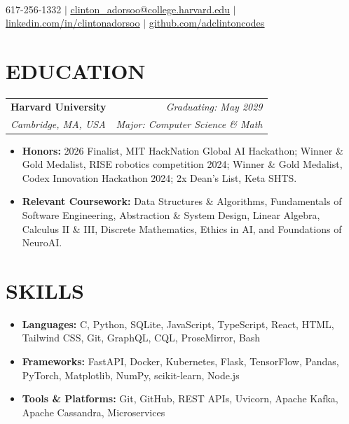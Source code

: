 \documentclass[letterpaper,8pt]{extarticle}
\makeatletter
\newcommand{\ulink}[2]{\href{#1}{\underline{#2}}}
\newcommand{\resumeSubheading}[4]{%
  \vspace{2.4pt}%
  \begin{tabular*}{\textwidth}[t]{@{\extracolsep{\fill}}l r@{}}
    \textbf{#1} & \textit{#2} \\[0.7pt]
    \textit{#3} & \textit{#4} \\
  \end{tabular*}%
  \vspace{1.4pt}%
}
\makeatother
\begin{document}
\enlargethispage{0.55in}

\begin{center}
  {\fontsize{28}{32}\selectfont
   }\\[7pt]
  {\large
  617-256-1332
  \;$|$\;
  \ulink{mailto:clinton_adorsoo@college.harvard.edu}{clinton\_adorsoo@college.harvard.edu}
  \;$|$\;
  \ulink{https://linkedin.com/in/clintonadorsoo}{linkedin.com/in/clintonadorsoo}
  \;$|$\;
  \ulink{https://github.com/adclintoncodes}{github.com/adclintoncodes}}
\end{center}

\vspace{7pt}

\section{EDUCATION}
\resumeSubheading
  {Harvard University}{Graduating: May 2029}
  {Cambridge, MA, USA}{Major: Computer Science \& Math}
\begin{itemize}
  \item \textbf{Honors:} 2026 Finalist, MIT HackNation Global AI Hackathon; Winner \& Gold Medalist, RISE robotics competition 2024; Winner \& Gold Medalist, Codex Innovation Hackathon 2024; 2x Dean's List, Keta SHTS.
  \item \textbf{Relevant Coursework:} Data Structures \& Algorithms, Fundamentals of Software Engineering, Abstraction \& System Design, Linear Algebra, Calculus II \& III, Discrete Mathematics, Ethics in AI, and Foundations of NeuroAI.
\end{itemize}

\section{SKILLS}
\begin{itemize}
  \item \textbf{Languages:} C, Python, SQLite, JavaScript, TypeScript, React, HTML, Tailwind CSS, Git, GraphQL, CQL, ProseMirror, Bash
  \item \textbf{Frameworks:} FastAPI, Docker, Kubernetes, Flask, TensorFlow, Pandas, PyTorch, Matplotlib, NumPy, scikit-learn, Node.js
  \item \textbf{Tools \& Platforms:} Git, GitHub, REST APIs, Uvicorn, Apache Kafka, Apache Cassandra, Microservices
\end{itemize}
\end{document}
